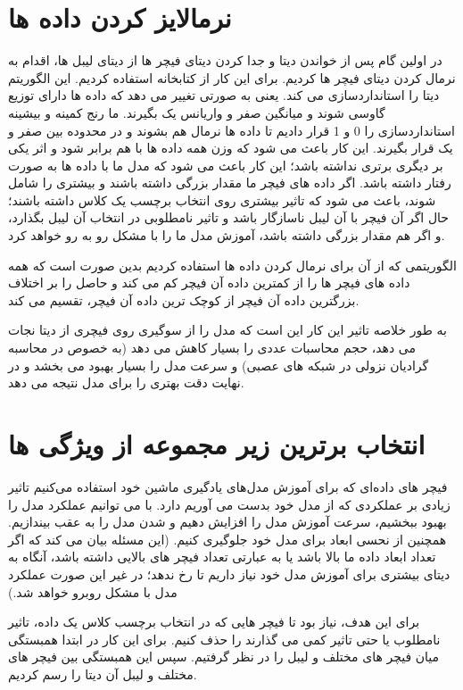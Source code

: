 \documentclass[12pt,onecolumn,a4paper]{article}
\begin{document}
\section{نرمالایز کردن داده ها}
در اولین گام پس از خواندن دیتا و جدا کردن دیتای فیچر ها از دیتای لیبل ها، اقدام به نرمال کردن دیتای فیچر ها کردیم. برای این کار از  کتابخانه  استفاده کردیم. این الگوریتم دیتا را استانداردسازی می کند. یعنی به صورتی تغییر می دهد که داده ها دارای توزیع گاوسی شوند و میانگین صفر و واریانس یک بگیرند. ما رنج کمینه و بیشینه استانداردسازی را 0 و 1 قرار دادیم تا داده ها نرمال هم بشوند و در محدوده بین صفر و یک قرار بگیرند. این کار باعث می شود که وزن همه داده ها با هم برابر شود و اثر یکی بر دیگری برتری نداشته باشد؛ این کار باعث می شود که مدل ما با داده ها به صورت  رفتار داشته باشد. اگر داده های فیچر ما مقدار بزرگی داشته باشند و  بیشتری را شامل شوند، باعث می شود که تاثیر بیشتری روی انتخاب برچسب یک کلاس داشته باشند؛ حال اگر آن فیچر با آن لیبل ناسازگار باشد و تاثیر نامطلوبی در انتخاب آن لیبل بگذارد، و اگر هم مقدار  بزرگی داشته باشد، آموزش مدل ما را با مشکل رو به رو خواهد کرد.

الگوریتمی که از آن برای نرمال کردن داده ها استفاده کردیم بدین صورت است که همه داده های فیچر ها را از کمترین داده آن فیچر کم می کند و حاصل را بر اختلاف بزرگترین داده آن فیچر از کوچک ترین داده آن فیچر، تقسیم می کند.

به طور خلاصه تاثیر این کار این است که مدل را از سوگیری روی فیچری از دیتا نجات می دهد، حجم محاسبات عددی را بسیار کاهش می دهد (به خصوص در محاسبه گرادیان نزولی در شبکه های عصبی) و سرعت مدل را بسیار بهبود می بخشد و در نهایت دقت بهتری را برای مدل نتیجه می دهد.

\section{انتخاب برترین زیر مجموعه از ویژگی ها}

فیچر های داده‌ای که برای آموزش مدل‌های یادگیری ماشین خود استفاده می‌کنیم تاثیر زیادی بر عملکردی که از مدل خود بدست می آوریم دارد. با  می توانیم عملکرد مدل را بهبود ببخشیم، سرعت آموزش مدل را افزایش دهیم و  شدن مدل را به عقب بیندازیم. همچنین از نحسی ابعاد برای مدل خود جلوگیری کنیم. (این مسئله بیان می کند که اگر تعداد ابعاد داده ما بالا باشد یا به عبارتی تعداد فیچر های بالایی داشته باشد، آنگاه به دیتای بیشتری برای آموزش مدل خود نیاز داریم تا  رخ ندهد؛ در غیر این صورت عملکرد مدل با مشکل روبرو خواهد شد.)

برای این هدف، نیاز بود تا فیچر هایی که در انتخاب برچسب کلاس یک داده، تاثیر نامطلوب یا حتی تاثیر کمی می گذارند را حذف کنیم. برای این کار در ابتدا همبستگی میان فیچر های مختلف و لیبل را در نظر گرفتیم.
سپس  این همبستگی بین فیچر های مختلف و لیبل آن دیتا را رسم کردیم.
\end{document}
